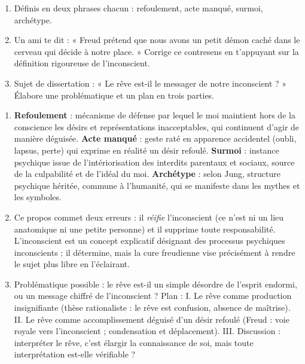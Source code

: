 \documentclass[11pt]{article}
\begin{document}
\begin{exercice}
\begin{enumerate}
\item Définis en deux phrases chacun : refoulement, acte manqué, surmoi, archétype.
\item Un ami te dit : « Freud prétend que nous avons un petit démon caché dans le cerveau qui décide à notre place. » Corrige ce contresens en t'appuyant sur la définition rigoureuse de l'inconscient.
\item Sujet de dissertation : « Le rêve est-il le messager de notre inconscient ? » Élabore une problématique et un plan en trois parties.
\end{enumerate}
\end{exercice}

\begin{corrige}[Exercice 1]
\begin{enumerate}
\item \textbf{Refoulement} : mécanisme de défense par lequel le moi maintient hors de la conscience les désirs et représentations inacceptables, qui continuent d'agir de manière déguisée. \textbf{Acte manqué} : geste raté en apparence accidentel (oubli, lapsus, perte) qui exprime en réalité un désir refoulé. \textbf{Surmoi} : instance psychique issue de l'intériorisation des interdits parentaux et sociaux, source de la culpabilité et de l'idéal du moi. \textbf{Archétype} : selon Jung, structure psychique héritée, commune à l'humanité, qui se manifeste dans les mythes et les symboles.
\item Ce propos commet deux erreurs : il \emph{réifie} l'inconscient (ce n'est ni un lieu anatomique ni une petite personne) et il supprime toute responsabilité. L'inconscient est un concept explicatif désignant des processus psychiques inconscients ; il détermine, mais la cure freudienne vise précisément à rendre le sujet plus libre en l'éclairant.
\item Problématique possible : le rêve est-il un simple désordre de l'esprit endormi, ou un message chiffré de l'inconscient ? Plan : I. Le rêve comme production insignifiante (thèse rationaliste : le rêve est confusion, absence de maîtrise). II. Le rêve comme accomplissement déguisé d'un désir refoulé (Freud : voie royale vers l'inconscient ; condensation et déplacement). III. Discussion : interpréter le rêve, c'est élargir la connaissance de soi, mais toute interprétation est-elle vérifiable ?
\end{enumerate}
\end{corrige}
\end{document}
